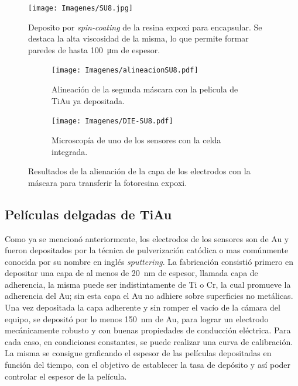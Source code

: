  				\begin{figure}[ht!]
 				\centering
 				\texttt{[image: Imagenes/SU8.jpg]}
 				\caption[Deposito de la resina expoxi SU8]{Deposito por \textit{spin-coating }de la resina expoxi para encapsular. Se destaca la alta viscosidad de la misma, lo que permite formar paredes de hasta \SI{100}{\um} de espesor.}
 				\label{fig:su8}
 				\end{figure}

 				\begin{figure}[th]
			 	   	    \centering
			 	   	    \begin{subfigure}[t]{0.495\textwidth}
			        	\texttt{[image: Imagenes/alineacionSU8.pdf]}
			       		\caption{Alineación de la segunda máscara con la pelicula de Ti\textbar Au ya depositada.}
			         	\label{fig:alineacion}
			     		\end{subfigure}
			     		\begin{subfigure}[t]{0.495\textwidth}
			     		\texttt{[image: Imagenes/DIE-SU8.pdf]}
			    		\caption{Microscopía de uno de los sensores con la celda integrada.}
			     		\label{fig:die-su8}	
						\end{subfigure}
						\caption[Alineación y celda integrada en SU8]{Resultados de la alienación de la capa de los electrodos con la máscara para transferir la fotoresina expoxi.}
			     		\label{fig:resultados-su8}
			     	   	\end{figure}

 		\subsection{Películas delgadas de Ti\textbar Au}

		 Como ya se mencionó anteriormente, los electrodos de los sensores son de Au y fueron depositados por la técnica de pulverización catódica o mas comúnmente conocida por su nombre en inglés \textit{sputtering}. La fabricación consistió primero en depositar una capa de al menos de \SI{20}{\nm} de espesor, llamada capa de  adherencia, la misma puede ser indistintamente de Ti o Cr, la cual promueve la adherencia del Au; sin esta capa el Au no adhiere sobre superficies no metálicas.\cite{Hieber1976} Una vez depositada la capa adherente y sin romper el vacío de la cámara del equipo, se depositó por lo menos \SI{150}{nm} de Au, para lograr un electrodo mecánicamente robusto y con buenas propiedades de conducción eléctrica. Para cada caso, en condiciones constantes, se puede realizar una curva de calibración. La misma se consigue graficando el espesor de las películas depositadas en función del tiempo, con el objetivo de establecer la tasa de depósito y así poder controlar el espesor de la película. 

